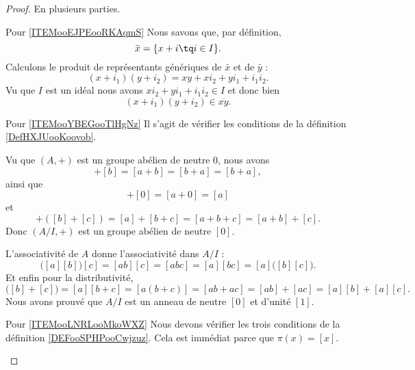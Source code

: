 \begin{proof}
    En plusieurs parties.
    \begin{subproof}
        \item[Pour \ref{ITEMooEJPEooRKAqmS}]
            Nous savons que, par définition,
            \begin{equation}
                \bar x=\{ x+i\tq i\in I \}.
            \end{equation}
            Calculons le produit de représentants génériques de \( \bar x\) et de \( \bar y\) :
            \begin{equation}
                (x+i_1)(y+i_2)=xy+xi_2+yi_1+i_1i_2.
            \end{equation}
            Vu que \( I\) est un idéal nous avons \( xi_2+yi_1+i_1i_2\in I\) et donc bien
            \begin{equation}
                (x+i_1)(y+i_2)\in \overline{ xy }.
            \end{equation}
        \item[Pour \ref{ITEMooYBEGooTlHgNz}]
            Il s'agit de vérifier les conditions de la définition \ref{DefHXJUooKoovob}.

            Vu que \( (A,+)\) est un groupe abélien de neutre \( 0\), nous avons
            \begin{equation}
                [a]+[b]=[a+b]=[b+a]=[b+a],
            \end{equation}
            ainsi que
            \begin{equation}
                [a]+[0]=[a+0]=[a]
            \end{equation}
            et
            \begin{equation}
                [a]+([b]+[c])=[a]+[b+c]=[a+b+c]=[a+b]+[c].
            \end{equation}
            Donc \( (A/I,+)\) est un groupe abélien de neutre \( [0]\).

            L'associativité de \( A\) donne l'associativité dans \( A/I\) :
            \begin{equation}
                \big( [a][b] \big)[c]=[ab][c]=[abc]=[a][bc]=[a]\big( [b][c] \big).
            \end{equation}
            Et enfin pour la distributivité,
            \begin{equation}
                [a]\big( [b]+[c] \big)=[a][b+c]=[a(b+c)]=[ab+ac]=[ab]+[ac]=[a][b]+[a][c].
            \end{equation}
            Nous avons prouvé que \( A/I\) est un anneau de neutre \( [0]\) et d'unité \( [1]\).
        \item[Pour \ref{ITEMooLNRLooMkoWXZ}]
            Nous devons vérifier les trois conditions de la définition \ref{DEFooSPHPooCwjzuz}. Cela est immédiat parce que \( \pi(x)=[x]\).
    \end{subproof}
\end{proof}


